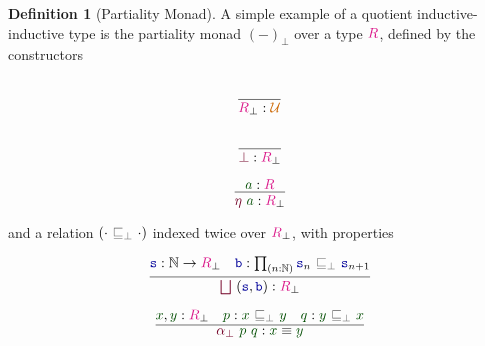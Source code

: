 \documentclass[twoside,11pt,openright]{report}
\theoremstyle{plain} %
\theoremstyle{definition}
\newtheorem{defn}[thm]{Definition}%
\theoremstyle{remark}
\newcommand*{\term}[1]{\textcolor{green!30!black}{#1}} %
\newcommand*{\type}[1]{\textcolor{magenta!90!black}{#1}}
\newcommand*{\universe}[1]{\textcolor{orange!80!black}{#1}}
\newcommand*{\relation}[1]{\textcolor{gray!75!black}{\ensuremath{\mathtt{#1}}}}
\newcommand*{\function}[1]{\textcolor{blue!60!black}{\ensuremath{\mathtt{#1}}}}
\newcommand*{\constructor}[1]{\textcolor{purple!60!black}{\ensuremath{\mathtt{#1}}}}
\begin{document}
\begin{defn}[Partiality Monad]
  A simple example of a quotient inductive-inductive type is the partiality monad \((-)_\bot\) over a type \(\type{R}\), defined by the constructors\\[-9mm]
  \begin{center}
    \begin{minipage}{0.25\linewidth}
      \begin{equation}
        \vcenter{\infer{\type{R}_\bot : \universe{\mathcal{U}}}{\strut}}
      \end{equation}
    \end{minipage}
    \hfill
    \begin{minipage}{0.25\linewidth}
      \begin{equation}
        \vcenter{\infer{\constructor{\bot} : \type{R}_\bot}{\strut}}
      \end{equation}
    \end{minipage}
    \hfill
    \begin{minipage}{0.25\linewidth}
      \begin{equation}
        \vcenter{\infer{\constructor{\eta}~\term{a} : \type{R}_\bot}{\term{a} : \type{R}}}
      \end{equation}
    \end{minipage}
  \end{center}
  and a relation \((\cdot~\relation{\sqsubseteq_{\bot}}~\cdot)\) indexed twice over \(\type{R}_\bot\), with properties\\[-9mm] 
  \begin{center}
    \begin{minipage}{0.45\linewidth}
      \begin{equation}
        \vcenter{\infer{\constructor{\bigsqcup}~(\function{s},\function{b}) : \type{R}_\bot}{\function{s} : \mathbb{N} \rightarrow \type{R}_\bot & \function{b} : \prod_{(n : \mathbb{N})} \function{s}_n~\relation{\sqsubseteq_{\bot}}~\function{s}_{n+1} }}
      \end{equation}
    \end{minipage}
    \hfill
    \begin{minipage}{0.45\linewidth}
      \begin{equation}
        \vcenter{\infer{\constructor{\alpha_{\bot}}~\term{p}~\term{q} : \term{x} \equiv \term{y}}{\term{x},\term{y} : \type{R}_\bot & \term{p} : \term{x}~\relation{\sqsubseteq_{\bot}}~\term{y} & \term{q} : \term{y}~\relation{\sqsubseteq_{\bot}}~\term{x}}}

\end{equation}
\end{minipage}
\end{center}
\end{defn}
\end{document}
